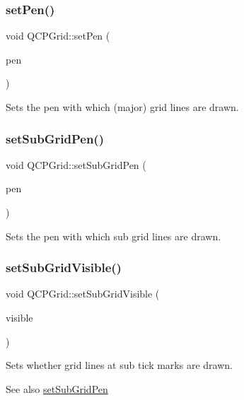 \subsubsection{\texorpdfstring{setPen()}{setPen()}}
{\footnotesize\ttfamily void Q\+C\+P\+Grid\+::set\+Pen (\begin{DoxyParamCaption}\item[{const Q\+Pen \&}]{pen }\end{DoxyParamCaption})}

Sets the pen with which (major) grid lines are drawn. \mbox{\label{class_q_c_p_grid_a9edd3593f384d1f0b0202a39cef4453d}} 
\subsubsection{\texorpdfstring{setSubGridPen()}{setSubGridPen()}}
{\footnotesize\ttfamily void Q\+C\+P\+Grid\+::set\+Sub\+Grid\+Pen (\begin{DoxyParamCaption}\item[{const Q\+Pen \&}]{pen }\end{DoxyParamCaption})}

Sets the pen with which sub grid lines are drawn. \mbox{\label{class_q_c_p_grid_ad4ad6bf714ec45e08845456355a1b700}} 
\subsubsection{\texorpdfstring{setSubGridVisible()}{setSubGridVisible()}}
{\footnotesize\ttfamily void Q\+C\+P\+Grid\+::set\+Sub\+Grid\+Visible (\begin{DoxyParamCaption}\item[{bool}]{visible }\end{DoxyParamCaption})}

Sets whether grid lines at sub tick marks are drawn.

\begin{DoxySeeAlso}{See also}
\mbox{\hyperlink{class_q_c_p_grid_a9edd3593f384d1f0b0202a39cef4453d}{set\+Sub\+Grid\+Pen}} 
\end{DoxySeeAlso}
\mbox{\label{class_q_c_p_grid_a209f40fdb252397b418b82d3494d8ea0}} 
